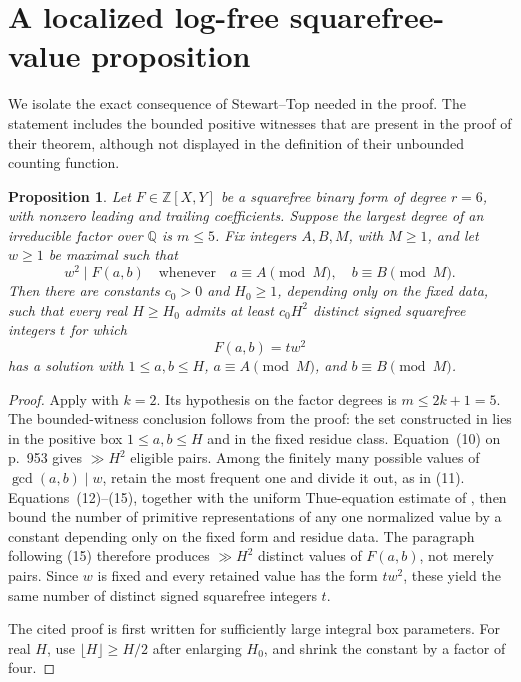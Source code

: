 \documentclass[11pt,reqno]{amsart}
\newtheorem{proposition}[theorem]{Proposition}
\theoremstyle{definition}
\theoremstyle{remark}
\newcommand{\Q}{\mathbb{Q}}
\newcommand{\Z}{\mathbb{Z}}
\begin{document}
\section{A localized log-free squarefree-value proposition}\label{sec:localized}

We isolate the exact consequence of Stewart--Top needed in the proof.  The
statement includes the bounded positive witnesses that are present in the
proof of their theorem, although not displayed in the definition of their
unbounded counting function.

\begin{proposition}\label{prop:localized-ST}
Let \(F\in\Z[X,Y]\) be a squarefree binary form of degree \(r=6\), with
nonzero leading and trailing coefficients.  Suppose the largest degree of an
irreducible factor over \(\Q\) is \(m\leq 5\).  Fix integers \(A,B,M\), with
\(M\geq1\), and let \(w\geq1\) be maximal such that
\[
  w^2\mid F(a,b)
  \quad\text{whenever}\quad
  a\equiv A\pmod M,\quad b\equiv B\pmod M.
\]
Then there are constants \(c_0>0\) and \(H_0\geq1\), depending only on the
fixed data, such that every real \(H\geq H_0\) admits at least \(c_0H^2\)
distinct signed squarefree integers \(t\) for which
\[
  F(a,b)=tw^2
\]
has a solution with
\(1\leq a,b\leq H\),
\(a\equiv A\pmod M\), and
\(b\equiv B\pmod M\).
\end{proposition}

\begin{proof}
Apply \cite[Theorem~1]{StewartTop1995} with \(k=2\).  Its hypothesis on the
factor degrees is \(m\leq2k+1=5\).  The bounded-witness conclusion follows
from the proof: the set constructed in
\cite[pp.~951--952]{StewartTop1995} lies in the positive box
\(1\leq a,b\leq H\) and in the fixed residue class.  Equation~(10) on
p.~953 gives \(\gg H^2\) eligible pairs.  Among the finitely many possible
values of \(\gcd(a,b)\mid w\), retain the most frequent one and divide it out,
as in (11).  Equations~(12)--(15), together with the uniform Thue-equation
estimate of \cite[Corollary~1]{Stewart1991}, then bound the number of primitive
representations of any one normalized value by a constant depending only on
the fixed form and residue data.  The paragraph following (15) therefore
produces \(\gg H^2\) distinct values of \(F(a,b)\), not merely pairs.  Since
\(w\) is fixed and every retained value has the form \(tw^2\), these yield the
same number of distinct signed squarefree integers \(t\).

The cited proof is first written for sufficiently large integral box
parameters.  For real \(H\), use \(\lfloor H\rfloor\geq H/2\) after enlarging
\(H_0\), and shrink the constant by a factor of four.
\end{proof}
\end{document}

